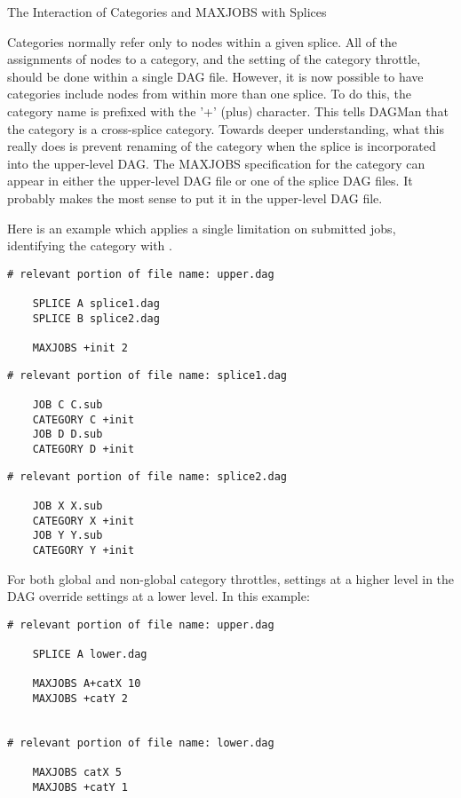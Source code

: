 \begin{description}
\item[The Interaction of Categories and MAXJOBS with Splices]
\end{description}

Categories normally refer only to nodes within a
given splice.
All of the assignments of nodes to a category, and the
setting of the category throttle, should be done within a single DAG file.
However, it is now possible to have categories include nodes
from within more than one splice.
To do this, the category name is prefixed with the '+' (plus) character.
This tells DAGMan that the category is
a cross-splice category.
Towards deeper understanding,
what this really does is prevent renaming
of the category when the splice is incorporated into the upper-level DAG.
The MAXJOBS specification for the category can appear in either the
upper-level DAG file or one of the splice DAG files.
It probably
makes the most sense to put it in the upper-level DAG file.

Here is an example which applies a single limitation on submitted jobs,
identifying the category with . 

\begin{verbatim}
# relevant portion of file name: upper.dag

    SPLICE A splice1.dag
    SPLICE B splice2.dag

    MAXJOBS +init 2
\end{verbatim}

\begin{verbatim}
# relevant portion of file name: splice1.dag

    JOB C C.sub
    CATEGORY C +init
    JOB D D.sub
    CATEGORY D +init

\end{verbatim}

\begin{verbatim}
# relevant portion of file name: splice2.dag

    JOB X X.sub
    CATEGORY X +init
    JOB Y Y.sub
    CATEGORY Y +init

\end{verbatim}

For both global and non-global category throttles, settings at a higher
level in the DAG override settings at a lower level.
In this example:

\begin{verbatim}
# relevant portion of file name: upper.dag

    SPLICE A lower.dag

    MAXJOBS A+catX 10
    MAXJOBS +catY 2


# relevant portion of file name: lower.dag

    MAXJOBS catX 5
    MAXJOBS +catY 1

\end{verbatim}

